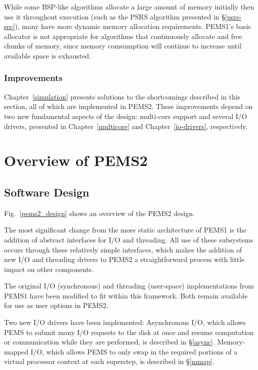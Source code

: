 \documentclass[12pt]{carletoncsthesis}
\begin{document}
While some BSP-like algorithms allocate a large amount of memory initially
then use it throughout execution (such as the PSRS algorithm presented in
\S\ref{psrs-sec}), many have more dynamic memory allocation requirements.
PEMS1's basic allocator is not appropriate for algorithms that continuously
allocate and free chunks of memory, since memory comsumption will continue
to increase until available space is exhausted.

\subsection{Improvements}


Chapter~\ref{simulation} presents solutions to the shortcomings described in
this section, all of which are implemented in PEMS2.  These improvements depend
on two new fundamental aspects of the design: multi-core support and several
I/O drivers, presented in Chapter~\ref{multicore} and Chapter~\ref{io-drivers},
respectively.


\chapter{Overview of PEMS2}
\thispagestyle{empty}
\label{overview-ch}


\section{Software Design}


Fig.~\ref{pems2_design} shows an overview of the PEMS2 design.

The most significant change from the more static architecture of PEMS1 is
the addition of abstract interfaces for I/O and threading.  All use of these
subsystems occurs through these relatively simple interfaces, which makes
the addition of new I/O and threading drivers to PEMS2 a straightforward
process with little impact on other components.

The original I/O (synchronous) and threading (user-space) implementations
from PEMS1 have been modified to fit within this framework.  Both remain
available for use as user options in PEMS2.

Two new I/O drivers have been implemented: Asynchronous I/O, which allows
PEMS to submit many I/O requests to the disk at once and resume computation
or communication while they are performed, is described in \S\ref{async}.
Memory-mapped I/O, which allows PEMS to only swap in the required portions
of a virtual processor context at each superstep, is described in \S\ref{mmap}.
\end{document}
